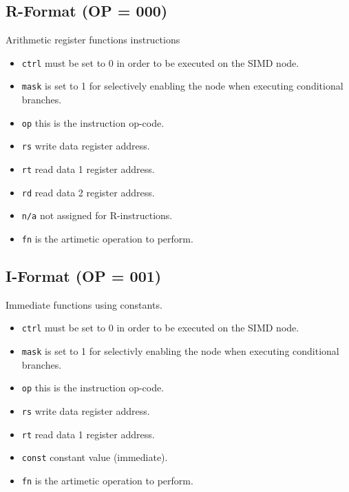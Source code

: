 \subsection{R-Format (OP = 000)}
Arithmetic register functions instructions



\begin{itemize}
\item {\tt ctrl} must be set to 0 in order to be executed on the SIMD node.
\item {\tt mask} is set to 1 for selectively enabling the node when executing
  conditional branches.
\item {\tt op} this is the instruction op-code.
\item {\tt rs} write data register address.
\item {\tt rt} read data 1 register address.
\item {\tt rd} read data 2 register address.
\item {\tt n/a} not assigned for R-instructions.
\item {\tt fn} is the artimetic operation to perform.
\end{itemize}



\subsection{I-Format (OP = 001)}
Immediate functions using constants.



\begin{itemize}
\item {\tt ctrl} must be set to 0 in order to be executed on the SIMD node.
\item {\tt mask} is set to 1 for selectivly enabling the node when executing
  conditional branches.
\item {\tt op} this is the instruction op-code.
\item {\tt rs} write data register address.
\item {\tt rt} read data 1 register address.
\item {\tt const} constant value (immediate).
\item {\tt fn} is the artimetic operation to perform.
\end{itemize}



